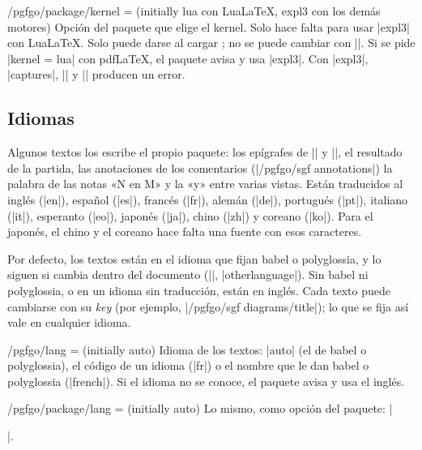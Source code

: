 \begin{goban}[9, stone = {radius = 4pt}, mark = {line = {color = red}}]
\begin{key}{/pgfgo/package/kernel =  (initially lua con Lua\LaTeX, expl3 con los demás motores)}
	Opción del paquete que elige el kernel. Solo hace falta para usar |expl3| con Lua\LaTeX. Solo puede darse al cargar \pgfgoname; no se puede cambiar con |\pgfgoset|. Si se pide |kernel = lua| con pdf\LaTeX, el paquete avisa y usa |expl3|. Con |expl3|, |captures|, || y |\sgf| producen un error.

	\begin{codeexample}
		\usepackage[kernel = expl3]{pgf-go}
	\end{codeexample}
\end{key}

\subsection{Idiomas}
\label{subsec:idiomas}

Algunos textos los escribe el propio paquete: los epígrafes de |\sgfdiagrams| y |\sgfproblem|, el resultado de la partida, las anotaciones de los comentarios (|/pgfgo/sgf annotations|) la palabra de las notas «N en M» y la «y» entre varias vistas. Están traducidos al inglés (|en|), español (|es|), francés (|fr|), alemán (|de|), portugués (|pt|), italiano (|it|), esperanto (|eo|), japonés (|ja|), chino (|zh|) y coreano (|ko|). Para el japonés, el chino y el coreano hace falta una fuente con esos caracteres.

Por defecto, los textos están en el idioma que fijan babel o polyglossia, y lo siguen si cambia dentro del documento (|\selectlanguage|, |otherlanguage|). Sin babel ni polyglossia, o en un idioma sin traducción, están en inglés. Cada texto puede cambiarse con su \emph{key} (por ejemplo, |/pgfgo/sgf diagrams/title|); lo que se fija así vale en cualquier idioma.

\begin{key}{/pgfgo/lang =  (initially auto)}
	Idioma de los textos: |auto| (el de babel o polyglossia), el código de un idioma (|fr|) o el nombre que le dan babel o polyglossia (|french|). Si el idioma no se conoce, el paquete avisa y usa el inglés.

	\begin{codeexample}
	\end{codeexample}
\end{key}

\begin{key}{/pgfgo/package/lang =  (initially auto)}
	Lo mismo, como opción del paquete: |\usepackage[lang = fr]{pgf-go}|.
\end{key}


\end{goban}

